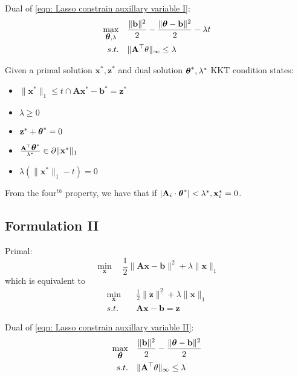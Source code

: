 \documentclass[
10pt, %
a4paper, %
oneside, %
headinclude,footinclude, %
BCOR5mm, %
]{scrartcl}
\newcommand{\AB}{\mathbf{A}}
\newcommand{\bB}{\mathbf{b}}
\newcommand{\xB}{\mathbf{x}}
\newcommand{\zB}{\mathbf{z}}
\newcommand{\thetaB}{\mbox{\boldmath$\theta$\unboldmath}}
\begin{document}
Dual of \ref{eqn: Lasso constrain auxillary variable I}:
\begin{equation}
	\begin{aligned}
		\max_{\thetaB, \lambda} & \quad \frac{\|\bB\|^2}{2} - \frac{\|\thetaB - \bB\|^2}{2} - \lambda t \\
		s.t. & \quad \|\AB^\top \theta\|_\infty \leq \lambda
	\end{aligned}
\end{equation}

Given a primal solution $\xB^*, \zB^*$ and dual solution $\thetaB^*, \lambda^*$ KKT condition states:
\begin{itemize}
	\item $\|\xB^*\|_1 \leq t \cap \AB\xB^* - \bB^* = \zB^*$
	\item $\lambda \geq 0$
	\item $\zB^* + \thetaB^* = 0$
	\item $\frac{\AB^\top\thetaB^*}{\lambda^*} \in \partial \|\xB^*\|_1$
	\item $\lambda (\|\xB^*\|_1 - t) = 0$
\end{itemize}
From the four$^{th}$ property, we have that if $|\AB_i \cdot \thetaB^*| < \lambda^*, \xB_i^* = 0$.

\subsection{Formulation II}
Primal:
\begin{equation}
	\min_\xB  \quad \frac{1}{2}\|\AB\xB - \bB\|^2 + \lambda \|\xB\|_1
\end{equation}
which is equivalent to 
\begin{equation}
\begin{aligned}
\min_\xB & \quad \frac{1}{2}\|\zB\|^2 + \lambda \|\xB\|_1 \\
s.t. & \quad  \AB\xB - \bB = \zB
\end{aligned}
\label{eqn: Lasso constrain auxillary variable II}
\end{equation}

Dual of \ref{eqn: Lasso constrain auxillary variable II}:
\begin{equation}
\begin{aligned}
\max_{\thetaB} & \quad \frac{\|\bB\|^2}{2} - \frac{\|\thetaB - \bB\|^2}{2} \\
s.t. & \quad \|\AB^\top \theta\|_\infty \leq \lambda
\end{aligned}
\end{equation}
\end{document}
